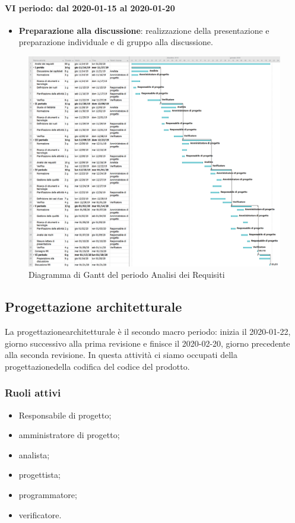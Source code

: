 \paragraph*{VI periodo: dal 2020-01-15 al 2020-01-20}
\begin{itemize}
	\item \textbf{Preparazione alla discussione}: realizzazione della presentazione e preparazione individuale e di gruppo alla discussione.
\end{itemize}

\begin{figure}
	\includegraphics[width=\linewidth]{./gantt/Analisi dei requisiti.png}
	\caption{Diagramma di Gantt del periodo Analisi dei Requisiti}
\end{figure}
\pagebreak

\subsection{Progettazione architetturale}
La progettazione\glosp architetturale è il secondo macro periodo: inizia il 2020-01-22, giorno successivo alla prima revisione e finisce il 2020-02-20, giorno precedente alla seconda revisione. In questa attività ci siamo occupati della progettazione\glosp della codifica del codice del prodotto\glo.

\subsubsection{Ruoli attivi}
\begin{itemize}
	\item Responsabile di progetto\glo;
	\item amministratore di progetto\glo;
	\item analista;
	\item progettista;
	\item programmatore;
	\item verificatore.
\end{itemize}

